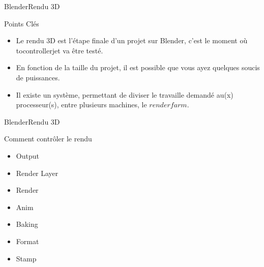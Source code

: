 \documentclass{beamer}
\begin{document}
\begin{frame}{Blender}{Rendu 3D}
    \begin{block}{Points Clés}
    \begin{itemize}
        \item{
        Le rendu 3D est l'étape finale d'un projet sur Blender, c'est le moment où tocontrollerjet va être testé.
        }
        \item{
        En fonction de la taille du projet, il est possible que vous ayez quelques soucis de puissances.
        }
        \item{
        Il existe un système, permettant de diviser le travaille demandé au(x) processeur(s), entre plusieurs machines, le $ render farm $.
        }
    \end{itemize}
    \end{block}
\end{frame}

\begin{frame}{Blender}{Rendu 3D}
    \begin{block}{Comment contrôler le rendu}
    \begin{itemize}
        \item     Output        \\
        \item     Render Layer  \\
        \item     Render        \\
        \item     Anim          \\
        \item     Baking        \\
        \item     Format        \\
        \item     Stamp         \\
    \end{itemize}
    \end{block}
\end{frame}
\end{document}

